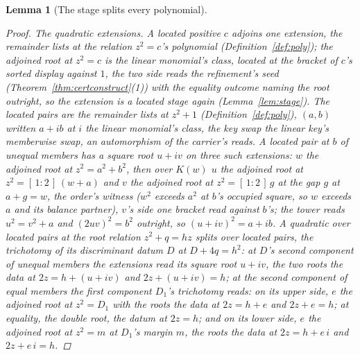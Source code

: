 \documentclass[11pt]{article}
\newtheorem{lemma}{Lemma}
\theoremstyle{definition}
\begin{document}
\begin{lemma}[The stage splits every polynomial]
\begin{proof}
\emph{The quadratic extensions.} A located positive $c$ adjoins
one extension, the remainder lists at the relation $z^2=c$'s polynomial
(Definition~\ref{def:poly}); the \emph{adjoined root at} $z^2=c$
is the linear monomial's class, located at the bracket of $c$'s
sorted display against $1$, the two side reads the refinement's seed
(Theorem~\ref{thm:certconstruct}(1)) with the equality outcome
naming the root outright, so the extension is a located stage again
(Lemma~\ref{lem:stage}). The \emph{located
pairs} are the remainder lists at $z^2+1$
(Definition~\ref{def:poly}), $(a,b)$ written $a+ib$ at
$i$ the linear monomial's class, the \emph{key swap} the linear
key's memberwise swap, an automorphism of the carrier's reads. A
located pair at $b$ of unequal members has a square root
$u+iv$ on three such extensions:
$w$ the adjoined root at $z^2=a^2+b^2$, then over $K(w)$
$u$ the adjoined root at $z^2=[\,1:2\,]\,(w+a)$ and
$v$ the adjoined root at $z^2=[\,1:2\,]\,g$ at the gap
$g$ at $a+g=w$, the order's witness ($w^2$ exceeds $a^2$ at $b$'s
occupied square, so $w$ exceeds $a$ and its balance partner),
$v$'s side one bracket read against $b$'s; the tower
reads $u^2=v^2+a$ and $(2uv)^2=b^2$ outright, so
$(u+iv)^2=a+ib$. A quadratic over located pairs at the root
relation $z^2+q=hz$ splits over located pairs, the trichotomy of
its \emph{discriminant datum} $D$ at $D+4q=h^2$: at $D$'s second
component of unequal members the extensions read its square root
$u+iv$, the two roots the data at $2z=h+(u{+}iv)$ and
$2z+(u{+}iv)=h$; at the second component of equal members the
first component $D_1$'s trichotomy reads: on its upper side, $e$
the adjoined root at $z^2=D_1$ with the roots the data at
$2z=h+e$ and $2z+e=h$; at equality, the double root, the
datum at $2z=h$; and on its lower side, $e$ the adjoined root
at $z^2=m$ at $D_1$'s margin $m$, the roots the data at
$2z=h+e\,i$ and $2z+e\,i=h$.


\end{proof}
\end{lemma}
\end{document}
